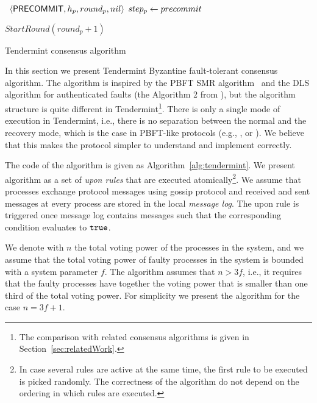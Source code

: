 \begin{algorithm}[htb!]
\begin{algorithmic}[1]
\SHORTSPACE
{} \label{line:tab:onTimeoutPrevote}
\STATE \Broadcast \ $\langle\mathsf{PRECOMMIT},h_p,round_p,nil\rangle$   \label{line:tab:precommit-nil-onTimeout}
\STATE $step_p \leftarrow precommit$
\ENDIF	
\ENDFUNCTION

\SHORTSPACE
{} \label{line:tab:onTimeoutPrecommit}
\STATE $StartRound(round_p + 1)$ \label{line:tab:nextRound} 
\ENDIF	
\ENDFUNCTION	
\end{algorithmic}
\caption{Tendermint consensus algorithm}
\label{alg:tendermint}
\end{algorithm}

In this section we present Tendermint Byzantine fault-tolerant consensus algorithm. The algorithm is inspired by the PBFT SMR algorithm~\cite{CL02:tcs} and the DLS algorithm for authenticated faults (the Algorithm 2 from \cite{DLS88:jacm}), but the algorithm structure is quite different in Tendermint\footnote{The comparison with related consensus algorithms is given in Section~\ref{sec:relatedWork}.}. There is only a single mode of execution in Tendermint, i.e., there is no separation between the normal and the recovery mode, which is the case in PBFT-like protocols (e.g., \cite{CL02:tcs}, \cite{Ver09:spinning} or \cite{Cle09:aardvark}). We believe that this makes the protocol simpler to understand and implement correctly.
   
The code of the algorithm is given as Algorithm~\ref{alg:tendermint}. We present algorithm as a set of \emph{upon rules} that are executed atomically\footnote{In case several rules are active at the same time, the first rule to be executed is picked randomly. The correctness of the algorithm do not depend on the ordering in which rules are executed.}. We assume that processes exchange protocol messages using gossip protocol and received and sent messages at every process are stored in the local \emph{message log}. The upon rule is triggered once message log contains messages such that the corresponding condition evaluates to $\tt{true}$. 

We denote with $n$ the total voting power of the processes in the system, and we assume that the total voting power of faulty processes in the system is bounded with a system parameter $f$. 
The algorithm assumes that $n > 3f$, i.e., it requires that the faulty processes have together the voting power that is smaller than one third of the total voting power. For simplicity we present the algorithm for the case $n = 3f + 1$.

